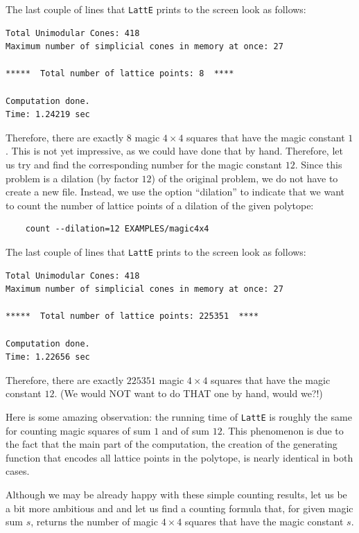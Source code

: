 \documentclass{article}
\begin{document}
The last couple of lines that {\tt LattE} prints to the screen
look as follows:
\begin{verbatim}
Total Unimodular Cones: 418
Maximum number of simplicial cones in memory at once: 27

*****  Total number of lattice points: 8  ****

Computation done.
Time: 1.24219 sec
\end{verbatim}
Therefore, there are exactly $8$ magic $4\times 4$ squares that
have the magic constant $1$. This is not yet impressive, as we could
have done that by hand. Therefore, let us try and find the
corresponding number for the magic constant $12$. Since this problem
is a dilation (by factor $12$) of the original problem, we do not have
to create a new file. Instead, we use the option ``dilation'' to indicate
that we want to count the number of lattice points of a dilation of
the given polytope:
\begin{verbatim}
    count --dilation=12 EXAMPLES/magic4x4
\end{verbatim}
The last couple of lines that {\tt LattE} prints to the screen
look as follows:
\begin{verbatim}
Total Unimodular Cones: 418
Maximum number of simplicial cones in memory at once: 27

*****  Total number of lattice points: 225351  ****

Computation done.
Time: 1.22656 sec
\end{verbatim}
Therefore, there are exactly $225351$ magic $4\times 4$ squares that
have the magic constant $12$. (We would NOT want to do THAT one by
hand, would we?!) 

Here is some amazing observation: the running time of {\tt LattE}
is roughly the same for counting magic squares of sum $1$ and of sum
$12$. This phenomenon is due to the fact that the main part of the
computation, the creation of the generating function that encodes all
lattice points in the polytope, is nearly identical in both cases.

Although we may be already happy with these simple counting results,
let us be a bit more ambitious and and let us find a counting formula
that, for given magic sum $s$, returns the number of magic 
$4\times 4$ squares that have the magic constant $s$.
\end{document}
